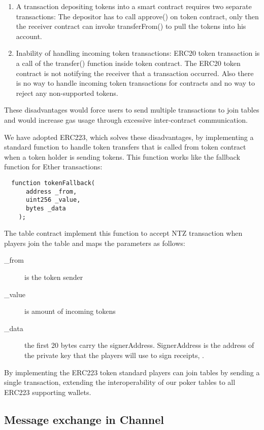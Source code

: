 \begin{enumerate}
\item A transaction depositing tokens into a smart contract requires two separate transactions: The depositor has to call approve() on token contract, only then the receiver contract can invoke transferFrom() to pull the tokens into his account.
\item Inability of handling incoming token transactions: ERC20 token transaction is a call of the transfer() function inside token contract. The ERC20 token contract is not notifying the receiver that a transaction occurred. Also there is no way to handle incoming token transactions for contracts and no way to reject any non-supported tokens.
\end{enumerate}

These disadvantages would force users to send multiple transactions to join tables and would increase gas usage through excessive inter-contract communication.

We have adopted ERC223, which solves these disadvantages, by implementing a standard function to handle token transfers that is called from token contract when a token holder is sending tokens. This function works like the fallback function for Ether transactions:

\begin{verbatim}
  function tokenFallback(
      address _from,
      uint256 _value,
      bytes _data
    );
\end{verbatim}

The table contract implement this function to accept NTZ transaction when players join the table and maps the parameters as follows:

\begin{description}
\item[\_from] is the token sender
\item[\_value] is amount of incoming tokens
\item[\_data] the first 20 bytes carry the signerAddress. SignerAddress is the address of the private key that the players will use to sign receipts, . 
\end{description}

By implementing the ERC223 token standard players can join tables by sending a single transaction, extending the interoperability of our poker tables to all ERC223 supporting wallets.

\subsection{Message exchange in Channel}


